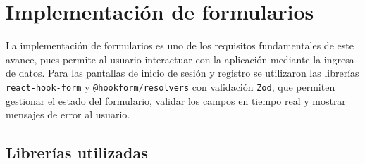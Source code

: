 
\section{Implementaci\'on de formularios}

La implementaci\'on de formularios es uno de los requisitos fundamentales de
este avance, pues permite al usuario interactuar con la aplicaci\'on mediante
la ingresa de datos. Para las pantallas de inicio de sesi\'on y registro se
utilizaron las librer\'ias \texttt{react-hook-form} y \texttt{@hookform/resolvers}
con validaci\'on \texttt{Zod}, que permiten gestionar el estado del formulario,
validar los campos en tiempo real y mostrar mensajes de error al usuario.

\subsection{Librer\'ias utilizadas}

\begin{table}[H]
  \centering
  \caption{Librer\'ias para gesti\'on de formularios}
\end{table}

